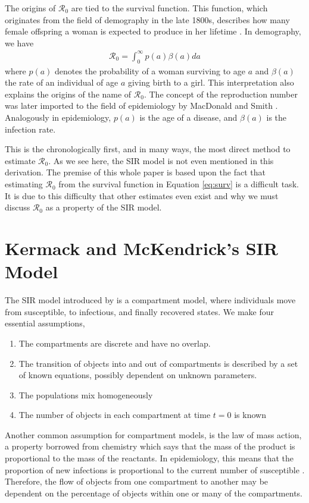 \documentclass[12pt]{article}
\newcommand{\rr}{\ensuremath{\mathcal{R}_0}}
\begin{document}
The origins of $\rr$ are tied to the survival function.  This function, which originates from the field of demography in the late 1800s, describes how many female offspring a woman is expected to produce in her lifetime \citep{dietz1993estimation}.  In demography, we have
\begin{align}\label{eq:surv}
\rr = \int_0^\infty p(a) \beta(a) da
\end{align}
where $p(a)$ denotes the probability of a woman surviving to age $a$ and $\beta(a)$ the rate of an individual of age $a$ giving birth to a  girl.   This interpretation also explains the origins of the name of $\rr$.  The concept of the reproduction number was later imported to the field of epidemiology by MacDonald and Smith \citep{dietz1993estimation}.  Analogously in epidemiology, $p(a)$ is the age of a disease, and $\beta(a)$ is the infection rate.

This is the chronologically first, and in many ways, the most direct method to estimate $\rr$.  As we see here, the SIR model is not even mentioned in this derivation.  The premise of this whole paper is based upon the fact that estimating $\rr$ from the survival function in Equation \eqref{eq:surv} is a difficult task.  It is due to this difficulty that other estimates even exist and why we must discuss $\rr$ as a property of the SIR model.


\section{Kermack and McKendrick's SIR Model}
\label{sec:sir-intro}

The SIR model introduced by \cite{Kermack700} is a compartment model, where individuals move from susceptible, to infectious, and finally recovered states.  We make four essential assumptions,
\begin{enumerate}
\item The compartments are discrete and have no overlap.
\item The transition of objects into and out of compartments is described by a set of known equations, possibly dependent on unknown parameters.
\item The populations mix homogeneously
  \item The number of objects in each compartment at time $t=0$ is known
  \end{enumerate}  


Another common assumption for compartment models, is the law of mass action, a property borrowed from chemistry which says that the mass of the product is proportional to the mass of the reactants.  In epidemiology, this means that the proportion of new infections is proportional to the current  number of susceptible \citep{anderson1992}.  Therefore, the flow of objects from one compartment to another may be dependent on the percentage of objects within one or many of the compartments. 
\end{document}
